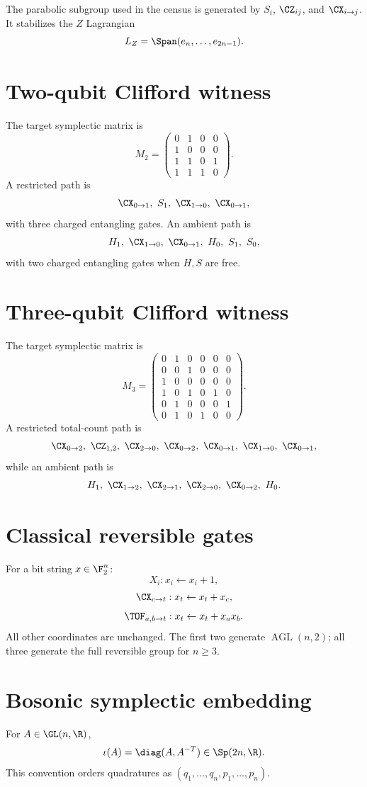 The parabolic subgroup used in the census is generated by $S_i$, $\CZ_{ij}$, and $\CX_{i\to j}$.  It stabilizes the $Z$ Lagrangian
\[
L_Z=\Span(e_n,\ldots,e_{2n-1}).
\]

\section{Two-qubit Clifford witness}
The target symplectic matrix is
\[
M_2=
\begin{pmatrix}
0&1&0&0\\
1&0&0&0\\
1&1&0&1\\
1&1&1&0
\end{pmatrix}.
\]
A restricted path is
\[
\CX_{0\to1},\ S_1,\ \CX_{1\to0},\ \CX_{0\to1},
\]
with three charged entangling gates.  An ambient path is
\[
H_1,\ \CX_{1\to0},\ \CX_{0\to1},\ H_0,\ S_1,\ S_0,
\]
with two charged entangling gates when $H,S$ are free.

\section{Three-qubit Clifford witness}
The target symplectic matrix is
\[
M_3=
\begin{pmatrix}
0&1&0&0&0&0\\
0&0&1&0&0&0\\
1&0&0&0&0&0\\
1&0&1&0&1&0\\
0&1&0&0&0&1\\
0&1&0&1&0&0
\end{pmatrix}.
\]
A restricted total-count path is
\[
\CX_{0\to2},\ \CZ_{1,2},\ \CX_{2\to0},\ \CX_{0\to2},
\ \CX_{0\to1},\ \CX_{1\to0},\ \CX_{0\to1},
\]
while an ambient path is
\[
H_1,\ \CX_{1\to2},\ \CX_{2\to1},\ \CX_{2\to0},\ \CX_{0\to2},\ H_0.
\]

\section{Classical reversible gates}
For a bit string $x\in\F_2^n$:
\[
X_i:x_i\leftarrow x_i+1,
\]
\[
\CX_{c\to t}:x_t\leftarrow x_t+x_c,
\]
\[
\TOF_{a,b\to t}:x_t\leftarrow x_t+x_ax_b.
\]
All other coordinates are unchanged.  The first two generate $\operatorname{AGL}(n,2)$; all three generate the full reversible group for $n\ge3$.

\section{Bosonic symplectic embedding}
For $A\in\GL(n,\R)$,
\[
\iota(A)=\diag(A,A^{-T})\in\Sp(2n,\R).
\]
This convention orders quadratures as $(q_1,\ldots,q_n,p_1,\ldots,p_n)$.

